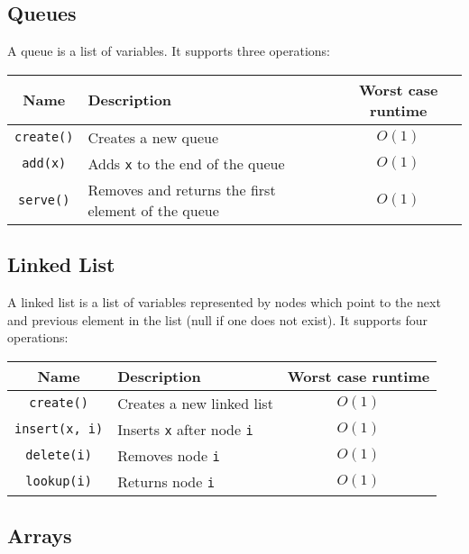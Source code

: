 \documentclass[a4paper, 12pt, twoside]{article}
\begin{document}
\subsection{Queues}

A queue is a list of variables. It supports three operations:

\begin{center}
  \begin{tabular}{ || c | p{6.5cm} | c || }
    \hline
    Name & Description & Worst case runtime \\
    \hline
    \texttt{create()} & Creates a new queue & $O(1)$ \\
    \hline
    \texttt{add(x)} & Adds \texttt{x} to the end of the queue & $O(1)$ \\
    \hline
    \texttt{serve()} & Removes and returns the first element of the queue & $O(1)$ \\
    \hline
  \end{tabular}
\end{center}

\subsection{Linked List}

A linked list is a list of variables represented by nodes which
point to the next and previous element in the list (null if one does
not exist). 
It supports four operations:

\begin{center}
  \begin{tabular}{ || c | p{6.5cm} | c || }
    \hline
    Name & Description & Worst case runtime \\
    \hline
    \texttt{create()} & Creates a new linked list & $O(1)$ \\
    \hline
    \texttt{insert(x, i)} & Inserts \texttt{x} after node \texttt{i} & $O(1)$ \\
    \hline
    \texttt{delete(i)} & Removes node \texttt{i} & $O(1)$ \\
    \hline
    \texttt{lookup(i)} & Returns node \texttt{i} & $O(1)$ \\
    \hline
  \end{tabular}
\end{center}

\subsection{Arrays}
\end{document}
